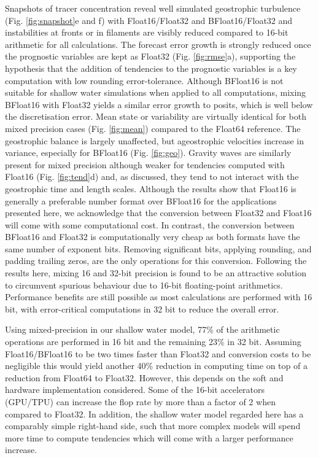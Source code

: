 Snapshots of tracer concentration reveal well simulated geostrophic turbulence (Fig. \ref{fig:snapshot}e and f) with Float16/Float32
and BFloat16/Float32 and instabilities at fronts or in filaments are visibly reduced compared to 16-bit arithmetic for all calculations.
The forecast error growth is strongly reduced once the prognostic variables are kept as Float32 (Fig. \ref{fig:rmse}a), supporting the
hypothesis that the addition of tendencies to the prognostic variables is a key computation with low rounding error-tolerance. Although
BFloat16 is not suitable for shallow water simulations when applied to all computations, mixing BFloat16 with Float32 yields a similar error
growth to posits, which is well below the discretisation error. Mean state or variability are virtually identical for both mixed precision cases
(Fig. \ref{fig:mean}) compared to the Float64 reference. The geostrophic balance is largely unaffected, but ageostrophic velocities
increase in variance, especially for BFloat16 (Fig. \ref{fig:geo}). Gravity waves are similarly present for mixed precision although weaker
for tendencies computed with Float16 (Fig. \ref{fig:tend}d) and, as discussed, they tend to not interact with the geostrophic time and
length scales. Although the results show that Float16 is generally a preferable number format over BFloat16 for the applications presented
here, we acknowledge that the conversion between Float32 and Float16 will come with some computational cost. In contrast, the
conversion between BFloat16 and Float32 is computationally very cheap as both formats have the same number of exponent bits.
Removing significant bits, applying rounding, and padding trailing zeros, are the only operations for this conversion. Following the
results here, mixing 16 and 32-bit precision is found to be an attractive solution to circumvent spurious behaviour due to 16-bit
floating-point arithmetics. Performance benefits are still possible as most calculations are performed with 16 bit, with error-critical
computations in 32 bit to reduce the overall error.

Using mixed-precision in our shallow water model, 77\% of the arithmetic operations are performed in 16 bit and the remaining
23\% in 32 bit. Assuming Float16/BFloat16 to be two times faster than Float32 and conversion costs to be negligible this would
yield another 40\% reduction in computing time on top of a reduction from Float64 to Float32. However, this depends on the soft
and hardware implementation considered. Some of the 16-bit accelerators (GPU/TPU) can increase the flop rate by more than a
factor of 2 when compared to Float32. In addition, the shallow water model regarded here has a comparably simple right-hand side,
such that more complex models will spend more time to compute tendencies which will come with a larger performance increase.

